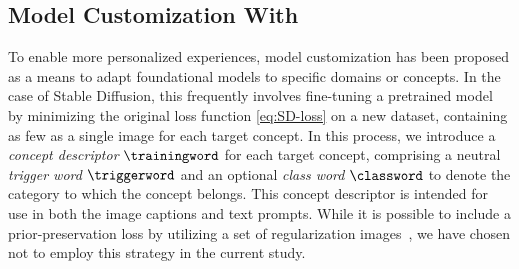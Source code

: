 \subsection{Model Customization With \lora}

To enable more personalized experiences, model customization has been proposed as a means to adapt foundational models to specific domains or concepts.
In the case of Stable Diffusion, this frequently involves fine-tuning a pretrained model by minimizing the original loss function \eqref{eq:SD-loss} on a new dataset, containing as few as a single image for each target concept. 
In this process, we introduce a \emph{concept descriptor} 
$\trainingword$ for each target concept, comprising a neutral \emph{trigger word} 
$\triggerword$ and an optional \emph{class word} 
$\classword$ to denote the category to which the concept belongs. 
This concept descriptor is intended for use in both the image captions and text prompts.
While it is possible to include a prior-preservation loss by utilizing a set of regularization images~\citep{ruiz2023dreambooth,kumari2023multi}, we have chosen not to employ this strategy in the current study.



